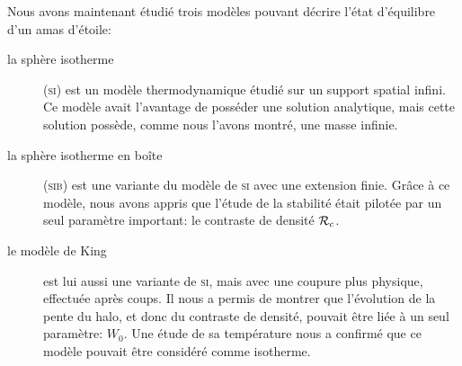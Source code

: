 Nous avons maintenant étudié trois modèles pouvant décrire l'état d'équilibre d'un amas d'étoile:
\begin{description}
	\item[la sphère isotherme] (\textsc{si}) est un modèle thermodynamique étudié sur un support spatial infini. Ce modèle avait l'avantage de posséder une solution analytique,
		mais cette solution possède, comme nous l'avons montré, une masse infinie.
	\item[la sphère isotherme en boîte] (\textsc{sib}) est une variante du modèle de \textsc{si} avec une extension
		finie. Grâce à ce modèle, nous avons appris que l'étude de la stabilité était pilotée par un seul paramètre important:
		le contraste de densité $\mathcal{R}_c$.
	\item[le modèle de King] est lui aussi une variante de \textsc{si}, mais avec une coupure plus physique, effectuée après coups. Il nous a permis de montrer que l'évolution
		de la pente du halo, et donc du contraste de densité, pouvait être liée à un seul paramètre: $W_0$.
		Une étude de sa température nous a confirmé que ce modèle pouvait être considéré comme isotherme.
\end{description}
